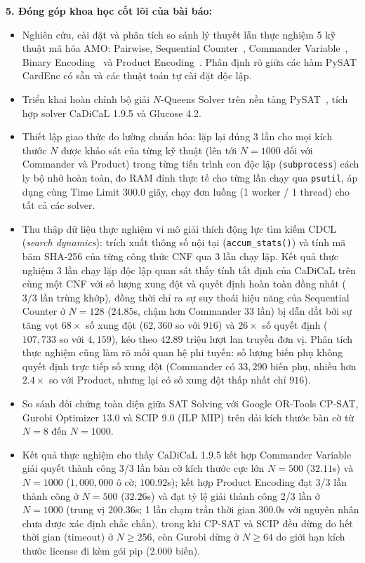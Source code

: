 \documentclass[a4paper,fleqn]{cas-sc}
\begin{document}
\noindent\textbf{5. Đóng góp khoa học cốt lõi của bài báo:}
\begin{itemize}
    \item Nghiên cứu, cài đặt và phân tích so sánh lý thuyết lẫn thực nghiệm 5 kỹ thuật mã hóa AMO: Pairwise, Sequential Counter~\cite{sinz2005towards}, Commander Variable~\cite{klieber2007efficient}, Binary Encoding~\cite{prestwich2009cnf,frisch2010sat} và Product Encoding~\cite{chen2010product}. Phân định rõ giữa các hàm PySAT CardEnc có sẵn và các thuật toán tự cài đặt độc lập.
    \item Triển khai hoàn chỉnh bộ giải $N$-Queens Solver trên nền tảng PySAT~\cite{ignatiev2018pysat}, tích hợp solver CaDiCaL 1.9.5 và Glucose 4.2.
    \item Thiết lập giao thức đo lường chuẩn hóa: lặp lại đúng 3 lần cho mọi kích thước $N$ được khảo sát của từng kỹ thuật (lên tới $N=1000$ đối với Commander và Product) trong từng tiến trình con độc lập (\texttt{subprocess}) cách ly bộ nhớ hoàn toàn, đo RAM đỉnh thực tế cho từng lần chạy qua \texttt{psutil}, áp dụng cùng Time Limit 300.0 giây, chạy đơn luồng (1 worker / 1 thread) cho tất cả các solver.
    \item Thu thập dữ liệu thực nghiệm vi mô giải thích động lực tìm kiếm CDCL (\textit{search dynamics}): trích xuất thông số nội tại (\texttt{accum\_stats()}) và tính mã băm SHA-256 của từng công thức CNF qua 3 lần chạy lặp. Kết quả thực nghiệm 3 lần chạy lặp độc lập quan sát thấy tính tất định của CaDiCaL trên cùng một CNF với số lượng xung đột và quyết định hoàn toàn đồng nhất ($3/3$ lần trùng khớp), đồng thời chỉ ra sự suy thoái hiệu năng của Sequential Counter ở $N=128$ ($24.85$s, chậm hơn Commander 33 lần) bị dẫn dắt bởi sự tăng vọt $68\times$ số xung đột ($62{,}360$ so với $916$) và $26\times$ số quyết định ($107{,}733$ so với $4{,}159$), kéo theo $42.89$ triệu lượt lan truyền đơn vị. Phân tích thực nghiệm cũng làm rõ mối quan hệ phi tuyến: số lượng biến phụ không quyết định trực tiếp số xung đột (Commander có $33{,}290$ biến phụ, nhiều hơn $2.4\times$ so với Product, nhưng lại có số xung đột thấp nhất chỉ $916$).
    \item So sánh đối chứng toàn diện giữa SAT Solving với Google OR-Tools CP-SAT, Gurobi Optimizer 13.0 và SCIP 9.0 (ILP MIP) trên dải kích thước bàn cờ từ $N = 8$ đến $N = 1000$.
    \item Kết quả thực nghiệm cho thấy CaDiCaL 1.9.5 kết hợp Commander Variable giải quyết thành công 3/3 lần bàn cờ kích thước cực lớn $N = 500$ ($32.11$s) và $N = 1000$ ($1{,}000{,}000$ ô cờ; $100.92$s); kết hợp Product Encoding đạt 3/3 lần thành công ở $N = 500$ ($32.26$s) và đạt tỷ lệ giải thành công 2/3 lần ở $N = 1000$ (trung vị $200.36$s; 1 lần chạm trần thời gian 300.0s với nguyên nhân chưa được xác định chắc chắn), trong khi CP-SAT và SCIP đều dừng do hết thời gian (timeout) ở $N \ge 256$, còn Gurobi dừng ở $N \ge 64$ do giới hạn kích thước license đi kèm gói pip (2.000 biến).
\end{itemize}
\end{document}
